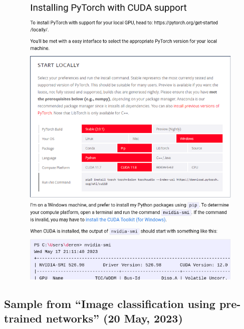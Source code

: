 \begin{figure}[!ht]
    \centering
    \includegraphics[width=\textwidth]{images/q1_sample_of_post_2.png}
\end{figure}

\newpage

\subsection*{Sample from ``Image classification using pre-trained networks'' (20 May, 2023)}

